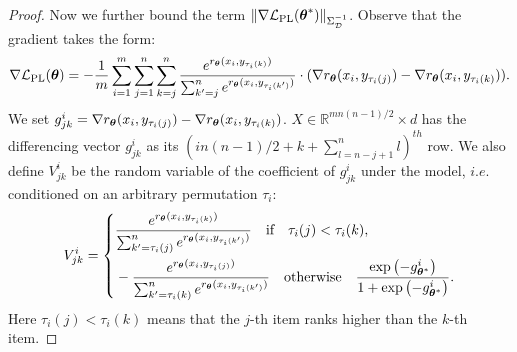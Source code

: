 \begin{proof}
Now we further bound the term $\left\|\nabla\mathcal{L}_{\text{PL}}({\boldsymbol{\theta}}^{*})\right\|_{{\Sigma}^{-1}_{\mathcal{D}}}$. Observe that the gradient takes the form:
\begin{equation*}
    \nabla \mathcal{L}_{\text{PL}}({\boldsymbol{\theta}})= -\frac{1}{m}\sum_{i=1}^{m}\sum_{j=1}^{n}\sum_{k=j}^{n}\frac{e^{r_{{\boldsymbol{\theta}}} (x_{i},y_{\tau_{i}(k)})}}{\sum_{k'=j}^{n}e^{r_{{\boldsymbol{\theta}}} (x_{i},y_{\tau_{i}(k')})}}\cdot(\nabla r_{{\boldsymbol{\theta}}}(x_{i},y_{\tau_{i}(j)})-\nabla r_{{\boldsymbol{\theta}}}(x_{i},y_{\tau_{i}(k)})).
\end{equation*}
We set $g^{i}_{jk}=\nabla r_{{\boldsymbol{\theta}}}(x_{i},y_{\tau_{i}(j)})-\nabla r_{{\boldsymbol{\theta}}}(x_{i},y_{\tau_{i}(k)})$. $X\in\mathbb{R}^{mn(n-1)/2}\times d$ has the differencing vector $g^{i}_{jk}$ as its $\left(in(n-1)/2+k+\sum^{n}_{l=n-j+1}l\right)^{th}$ row. We also define $V^{i}_{jk}$ be the random variable of the coefficient of $g^{i}_{jk}$ under the  model, $i.e.$ conditioned on an arbitrary permutation $\tau_{i}$:
\begin{equation*}
V^{i}_{jk} = \left\{
\begin{aligned}
& \frac{e^{r_{{\boldsymbol{\theta}}} (x_{i},y_{\tau_{i}(k)})}}{\sum_{k'=\tau_{i}(j)}^{n}e^{r_{{\boldsymbol{\theta}}} (x_{i},y_{\tau_{i}(k')})}} \quad \text{if} \quad \tau_{i}(j)<\tau_{i}(k), 
\\
& -\frac{e^{r_{{\boldsymbol{\theta}}} (x_{i},y_{\tau_{i}(j)})}}{\sum_{k'=\tau_{i}(k)}^{n}e^{r_{{\boldsymbol{\theta}}} (x_{i},y_{\tau_{i}(k')})}} \quad \text{otherwise} \quad \frac{\exp\left(-g^{i}_{{\boldsymbol{\theta}}^{*}}\right)}{1+\exp\left(-g^{i}_{{\boldsymbol{\theta}}^{*}}\right)}.
\end{aligned}
\right.
\end{equation*}
Here $\tau_{i}(j)<\tau_{i}(k)$ means that the $j$-th item ranks higher than the $k$-th item.


\end{proof}
